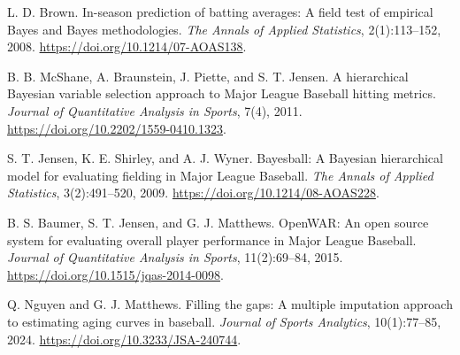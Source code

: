 
L. D. Brown.
\newblock In-season prediction of batting averages: A field test of empirical Bayes and Bayes methodologies.
\newblock \emph{The Annals of Applied Statistics}, 2(1):113--152, 2008.
\newblock \url{https://doi.org/10.1214/07-AOAS138}.

B. B. McShane, A. Braunstein, J. Piette, and S. T. Jensen.
\newblock A hierarchical Bayesian variable selection approach to Major League Baseball hitting metrics.
\newblock \emph{Journal of Quantitative Analysis in Sports}, 7(4), 2011.
\newblock \url{https://doi.org/10.2202/1559-0410.1323}.

S. T. Jensen, K. E. Shirley, and A. J. Wyner.
\newblock Bayesball: A Bayesian hierarchical model for evaluating fielding in Major League Baseball.
\newblock \emph{The Annals of Applied Statistics}, 3(2):491--520, 2009.
\newblock \url{https://doi.org/10.1214/08-AOAS228}.

B. S. Baumer, S. T. Jensen, and G. J. Matthews.
\newblock OpenWAR: An open source system for evaluating overall player performance in Major League Baseball.
\newblock \emph{Journal of Quantitative Analysis in Sports}, 11(2):69--84, 2015.
\newblock \url{https://doi.org/10.1515/jqas-2014-0098}.

Q. Nguyen and G. J. Matthews.
\newblock Filling the gaps: A multiple imputation approach to estimating aging curves in baseball.
\newblock \emph{Journal of Sports Analytics}, 10(1):77--85, 2024.
\newblock \url{https://doi.org/10.3233/JSA-240744}.
